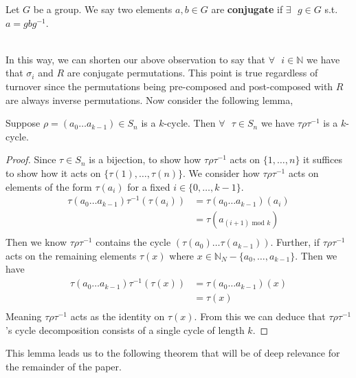 \begin{definition}
  Let $G$ be a group. We say two elements $a,b\in{G}$ are
  {\bf{conjugate}} if $\exists\text{ }g\in{G}$ s.t. $a=gbg^{-1}$.
\end{definition}
\text{}\\In this way, we can shorten our above observation to say that
$\forall\text{ }i\in\mathbb{N}$ we have that $\sigma_i$ and $R$ are
conjugate permutations. This point is true regardless of turnover since the permutations being pre-composed and post-composed with $R$ are always inverse permutations. Now consider the following lemma,\\
\begin{lemma}
  Suppose $\rho=(a_0\dots a_{k-1})\in S_n$ is a $k$-cycle. Then
  $\forall\text{ }\tau\in S_n$ we have
  $\tau\rho\tau^{-1}$ is a $k$-cycle.
  \label{conjugate_cycle}
\end{lemma}
\begin{proof}
  Since $\tau\in S_n$ is a bijection, to show how $\tau\rho\tau^{-1}$
  acts on $\{1,\dots, n\}$ it suffices to show how it acts on
  $\{\tau(1), \dots, \tau(n)\}$.
  We consider how $\tau\rho\tau^{-1}$ acts on elements of the form
  $\tau(a_i)$ for a fixed $i\in\{0,\dots,k-1\}$.
  \begin{align*}
    \tau(a_0\dots a_{k-1})\tau^{-1}(\tau(a_i)) & = \tau(a_0\dots
    a_{k-1})(a_i)
    \\
    & = \tau(a_{(i+1)\text{ mod }k}) \\
  \end{align*}
  Then we know $\tau\rho\tau^{-1}$ contains the cycle
  $(\tau(a_0)\dots \tau(a_{k-1}))$.
  Further, if $\tau\rho\tau^{-1}$ acts on the remaining elements
  $\tau(x)$ where $x\in\mathbb{N}_N - \{a_0,\dots,a_{k-1}\}$.
  Then we have
  \begin{align*}
    \tau(a_0\dots a_{k-1})\tau^{-1}(\tau(x)) & = \tau(a_0\dots a_{k-1})(x) \\
    & = \tau(x)                   \\
  \end{align*}
  Meaning $\tau\rho\tau^{-1}$ acts as the identity on $\tau(x)$. From
  this we can deduce that
  $\tau\rho\tau^{-1}$'s cycle decomposition consists of a single
  cycle of length $k$.
\end{proof}

\noindent This lemma leads us to the following theorem that will be of deep
relevance for the remainder of the paper.

